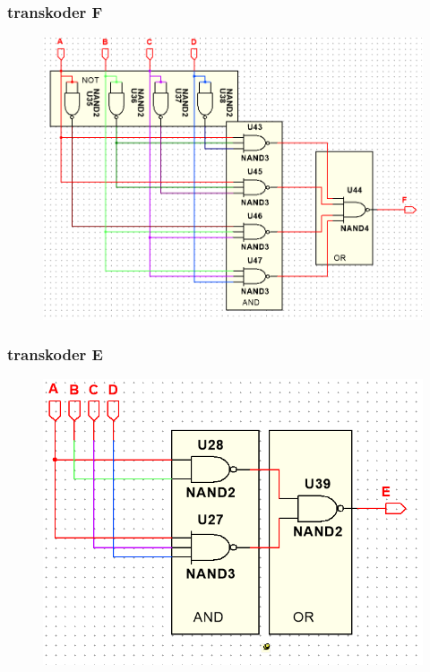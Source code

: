 \documentclass[a4paper]{article}
\begin{document}
\subsubsection{transkoder F}
\begin{figure}[H]
 \centering
 \includegraphics{schemat_F.png}
\end{figure}

\subsubsection{transkoder E}
\begin{figure}[H]
 \centering
 \includegraphics{schemat_E.png}
\end{figure}
\end{document}
